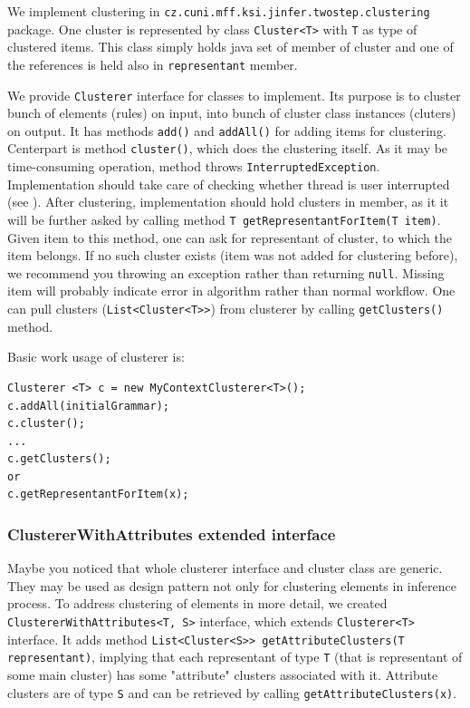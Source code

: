 \documentclass[a4paper,10pt,oneside]{article}
\newcommand{\code}[1]{\texttt{#1}}
\begin{document}
We implement clustering in \code{cz.cuni.mff.ksi.jinfer.twostep.clustering} package.
One cluster is represented by class \code{Cluster<T>} with \code{T} as type of clustered items.
This class simply holds java set of member of cluster and one of the references is held also in \code{representant} member.

We provide \code{Clusterer} interface for classes to implement.
Its purpose is to cluster bunch of elements (rules) on input, into  bunch of cluster class instances (cluters) on output.
It has methods \code{add()} and \code{addAll()} for adding items for clustering.
Centerpart is method \code{cluster()}, which does the clustering itself.
As it may be time-consuming operation, method throws \code{InterruptedException}.
Implementation should take care of checking whether thread is user interrupted (see \cite[p. 12]{archdoc}).
After clustering, implementation should hold clusters in member, as it it will be further asked by calling method \code{T getRepresentantForItem(T item)}.
Given item to this method, one can ask for representant of cluster, to which the item belongs.
If no such cluster exists (item was not added for clustering before), we recommend you throwing an exception rather than returning \code{null}.
Missing item will probably  indicate error in algorithm rather than normal workflow.
One can pull clusters (\code{List<Cluster<T>{}>}) from clusterer by calling \code{getClusters()} method.

Basic work usage of clusterer is:
\begin{verbatim}
Clusterer <T> c = new MyContextClusterer<T>();
c.addAll(initialGrammar);
c.cluster();
...
c.getClusters();
or
c.getRepresentantForItem(x);
\end{verbatim}

\subsubsection{ClustererWithAttributes extended interface}
Maybe you noticed that whole clusterer interface and cluster class are generic.
They may be used as design pattern not only for clustering elements in inference process.
To address clustering of elements in more detail, we created \code{ClustererWithAttributes<T, S>} interface, which extends \code{Clusterer<T>} interface.
It adds method \code{List<Cluster<S>{}> getAttributeClusters(T representant)}, implying that each representant of
type \code{T} (that is representant of some main cluster) has some "attribute" clusters associated with it.
Attribute clusters are of type \code{S} and can be retrieved by calling \code{getAttributeClusters(x)}.
\end{document}
